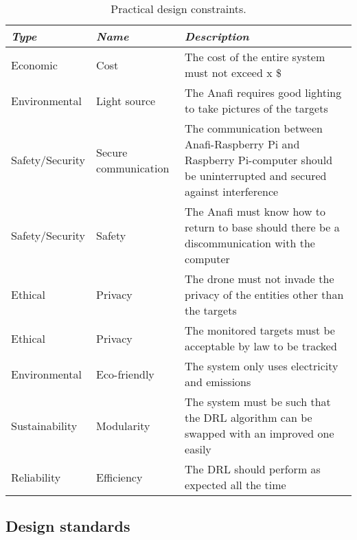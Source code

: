 \documentclass[../main.tex]{subfiles}
\begin{document}
\begin{table}[hbt!]
	\begin{tabular}{| P{2.4cm} | P{2cm} | P{10.5cm} |}
		\hline 
		\textit{Type} & \textit{Name } & \textit{Description} \\ \hline
		
		Economic & Cost & The cost of the entire system must not exceed x \$ \\ \hline 
		
		Environmental & Light source & The Anafi requires good lighting to take pictures of the targets \\ \hline
		
		Safety/Security & Secure communication & The communication between Anafi-Raspberry Pi and Raspberry Pi-computer should be uninterrupted and secured against interference \\ \hline
		
		Safety/Security & Safety & The Anafi must know how to return to base should there be a discommunication with the computer \\ \hline
		
		Ethical & Privacy & The drone must not invade the privacy of the entities other than the targets \\ \hline
		
		Ethical & Privacy & The monitored targets must be acceptable by law to be tracked \\ \hline
		
		Environmental & Eco-friendly & The system only uses electricity and emissions \\ \hline
		
		Sustainability & Modularity & The system must be such that the DRL algorithm can be swapped with an improved one easily \\ \hline 
		
		Reliability & Efficiency & The DRL should perform as expected all the time \\ \hline
		
	\end{tabular}
	\caption{Practical design constraints.}
\end{table}\label{tab: practical-design-constraints}

\newpage
\subsection{Design standards}
\end{document}

